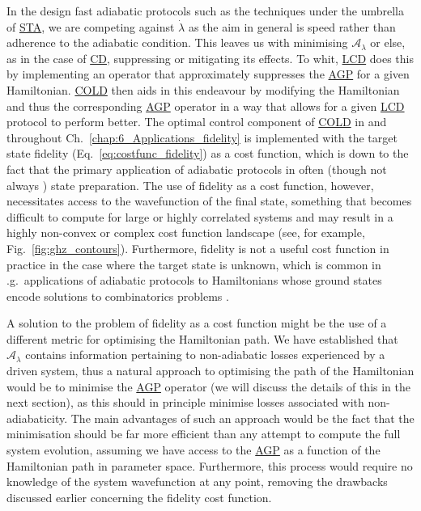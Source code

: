 \documentclass[a4paper,oneside,11pt]{book}
\newcommand{\AGP}[1]{\mathcal{A}_{#1}}
\newcommand{\dotlambda}{\dot{\lambda}}
\newcommand{\acrref}[1]{\hyperref[acr:#1]{#1}}
\begin{document}
In the design fast adiabatic protocols such as the techniques under the umbrella of \acrref{STA}, we are competing against $\dotlambda$ as the aim in general is speed rather than adherence to the adiabatic condition. This leaves us with minimising $\AGP{\lambda}$ or else, as in the case of \acrref{CD}, suppressing or mitigating its effects. To whit, \acrref{LCD} does this by implementing an operator that approximately suppresses the \acrref{AGP} for a given Hamiltonian. \acrref{COLD} then aids in this endeavour by modifying the Hamiltonian and thus the corresponding \acrref{AGP} operator in a way that allows for a given \acrref{LCD} protocol to perform better. The optimal control component of \acrref{COLD} in \cite{cepaite_counterdiabatic_2023} and throughout Ch.~\ref{chap:6_Applications_fidelity} is implemented with the target state fidelity (Eq.~\eqref{eq:costfunc_fidelity}) as a cost function, which is down to the fact that the primary application of adiabatic protocols in often (though not always \cite{pelegri_high-fidelity_2022}) state preparation. The use of fidelity as a cost function, however, necessitates access to the wavefunction of the final state, something that becomes difficult to compute for large or highly correlated systems and may result in a highly non-convex or complex cost function landscape (see, for example, Fig.~\ref{fig:ghz_contours}). Furthermore, fidelity is not a useful cost function in practice in the case where the target state is unknown, which is common in \@e.g.~applications of adiabatic protocols to Hamiltonians whose ground states encode solutions to combinatorics problems \cite{ebadi_quantum_2022, albash_adiabatic_2018}. 

A solution to the problem of fidelity as a cost function might be the use of a different metric for optimising the Hamiltonian path. We have established that $\AGP{\lambda}$ contains information pertaining to non-adiabatic losses experienced by a driven system, thus a natural approach to optimising the path of the Hamiltonian would be to minimise the \acrref{AGP} operator (we will discuss the details of this in the next section), as this should in principle minimise losses associated with non-adiabaticity. The main advantages of such an approach would be the fact that  the minimisation should be far more efficient than any attempt to compute the full system evolution, assuming we have access to the \acrref{AGP} as a function of the Hamiltonian path in parameter space. Furthermore, this process would require no knowledge of the system wavefunction at any point, removing the drawbacks discussed earlier concerning the fidelity cost function.
\end{document}
